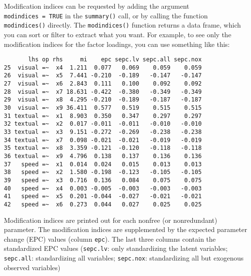 Modification indices can be requested by adding the argument
\texttt{modindices\ =\ TRUE} in the \texttt{summary()} call, or by
calling the function \texttt{modindices()} directly. The
\texttt{modindices()} function returns a data frame, which you can sort
or filter to extract what you want. For example, to see only the
modification indices for the factor loadings, you can use something like
this:

\begin{Shaded}
\begin{Highlighting}[]
\StringTok{ }
\StringTok{ }
\NormalTok{mi[mi}\OperatorTok{$}\OperatorTok{==}\NormalTok{,]}
\end{Highlighting}
\end{Shaded}

\begin{verbatim}
       lhs op rhs     mi    epc sepc.lv sepc.all sepc.nox
25  visual =~  x4  1.211  0.077   0.069    0.059    0.059
26  visual =~  x5  7.441 -0.210  -0.189   -0.147   -0.147
27  visual =~  x6  2.843  0.111   0.100    0.092    0.092
28  visual =~  x7 18.631 -0.422  -0.380   -0.349   -0.349
29  visual =~  x8  4.295 -0.210  -0.189   -0.187   -0.187
30  visual =~  x9 36.411  0.577   0.519    0.515    0.515
31 textual =~  x1  8.903  0.350   0.347    0.297    0.297
32 textual =~  x2  0.017 -0.011  -0.011   -0.010   -0.010
33 textual =~  x3  9.151 -0.272  -0.269   -0.238   -0.238
34 textual =~  x7  0.098 -0.021  -0.021   -0.019   -0.019
35 textual =~  x8  3.359 -0.121  -0.120   -0.118   -0.118
36 textual =~  x9  4.796  0.138   0.137    0.136    0.136
37   speed =~  x1  0.014  0.024   0.015    0.013    0.013
38   speed =~  x2  1.580 -0.198  -0.123   -0.105   -0.105
39   speed =~  x3  0.716  0.136   0.084    0.075    0.075
40   speed =~  x4  0.003 -0.005  -0.003   -0.003   -0.003
41   speed =~  x5  0.201 -0.044  -0.027   -0.021   -0.021
42   speed =~  x6  0.273  0.044   0.027    0.025    0.025
\end{verbatim}

Modification indices are printed out for each nonfree (or nonredundant)
parameter. The modification indices are supplemented by the expected
parameter change (EPC) values (column \texttt{epc}). The last three
columns contain the standardized EPC values (\texttt{sepc.lv}: only
standardizing the latent variables; \texttt{sepc.all}: standardizing all
variables; \texttt{sepc.nox}: standardizing all but exogenous observed
variables)
